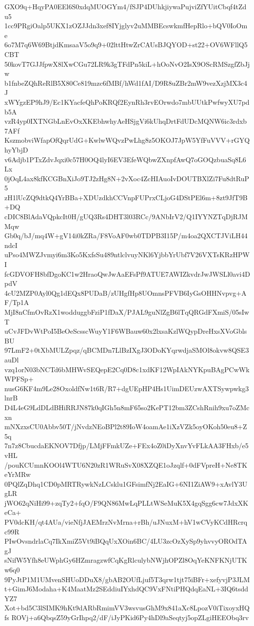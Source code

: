 GXO9q+HqyPA0EEl6S0xdqMUOGYm4/fSJP4DUhkjiywaPujviZfYUitCbqf4tZdu5
1cc9PRgiOalp5UKX1zOZJJdn3xef8IYjglyv2uMMBEcswkmfHepRlo+bQV0IoOme
6o7M7q6W69BtjdKmsaaV5o9q9+02lttHtwZrCAUsBJQYOD+st22+OV6WFllQ5CBT
50kovT7GJJfpwX8lXwCGu72LR9k3gTFdPn5kiL+hOoNvO2IsX9OScRMSzgfZbJjw
b1fnbeZQhReRlB5X80Ce819mzc6fMBf/hWd1fAI/D9R8uZBr2mW9vezXzjMX3c4J
xWYgzEP9hJ9/Ec1KYacfeQhPoKRQf2EynRh3rvEOrwdo7mbUUtkPwfwyXU7pdb5A
vzR4yp0IXTNGbLnEvOxXKEbhwhyAeHSjgVi6kUhqDrtFdUDcMQNW6ic3rdxb7AFf
KszmobviWfapOfQqrUdG+KwlwWQvzPwLhg8z5OKOJ7JpW5YfFuVVV+rGYQhyYbjD
v6Adjb1PTxZdvJqxi0c57H0OQ4lyI6EV3EfeWQbwZXnpfAwQ7oGOQzbuaSq8L6Lx
0jOqL4ax8kfKCGBnXiJo9TJ2zHg8N+2vXoc4ZcHIAuoIvDOUTBXlZi7Fu8dtRuP5
zH1lUcZQ9dtkQ4YrBBa+XDUzdkhCCVnpFUPrxCLjoG4DStPEl6m+8zt9JfT9B+DQ
cDIC8BlAdaVQpkcIt0H/gUQ3Rs4DHT3l03RCc/9ANbIrV2/Q1IYYNZTqDjRJMMqw
Gb0q/bJ/mq4W+gV14i0kZRa/F8VoAF0wb0TDPB3I15P/m4oa2QXCTJViLH44ndcI
uPso4MWZJvmyi6m3Ko5KxfsSu489ntlclvuyNKl6YjbbYrUbf7V26VXTsKRzHPWI
fcGDVOFH8bfDgoKC1w2HraoQwJwAaEFsPf9ATUE7AWIZkvdrJwJWSLl0avi4DpdV
4cU2MZP0Ayl0Qg1dEQx8PUDaB/zUHgfHp8UOmnsPFVB6IyGsOHHNvpvg+AF/Tp1A
MjI8nCfmOvRzX1wodduggbFziP1fDaX/PJAL9guNlZgB6lTqQRGdFXmiS/05sIwT
uCvJFDvWtPoI5BeOeScsscWuyY1F6WBauw60x2lxsaKzlWQypDreHxsXVoGblsBU
97LmF2+0tXbMULZpqz/qBCMDn7LlBzIXgJ3ODoKYqrwdjaSMOl8okvw8QSE3auDl
vzq1orN03bNCTd6bMHWvSEQepE2Cq0D8c1xdKF12WpIAkNYKpuBAgPCwWkWPFSp+
nusG6KF4m9Le28OxoldfNw1t6R/R7+dgUEpHP4Hs1UimDEUzwAXTSywpwkg3lnrB
D4L4eG9LdDLdBHiRRJN87k0qIGh5n8mF65so2KePT12bm3ZCshRnih9xu7oZMcxn
mNXzxsCU0Abbv50T/jNvdzNEoBPl2t89IoW4oamAe1iXzVZk5oyOKoh50eu8+Z5q
7n7z8CbucdaEKNOV7Dfjp/LMjFFmkUZe+FEx4oZ0iDyXnvYvFLkAA3FHxb/e5vHL
/pouKCUmnKOOl4WTU6N20zR1WRuSvX08XZQE1oJzqlf+0dFVpreH+Ne8TKeYrMRw
0PQlZqDhq1CD0pMRTRywkNzLCsklu1GFsimfNj2EaIG+6NI1ZiAW9+xAvlY3UgLR
jWO62qNiHi99+zqTy2+fqO/F9QN86MwLqPLLtWSeMuK5X4gqSgg6cw7JdxXKeCa+
PV0dcKH/qt4AUa/vieNfjJAEMrzNvMrna+rBh/uJNuxM+hV1wCVyKCdHRcrqc99R
PIwOvsndrlaCq7IkXmiZ5Vt9iBQqUxXOin6BC/4LU3zcOzXySp9yhvvyOROdTAgJ
sNifW5Yfh8eUWphGy6HZmragzwfCqKgRlculybNWjhOPZl8OqYeKNFKNjUTKw6q0
9PyJtP1M1UMvenSHUoDDuX8/gbAB2OUfLjuf5T3qrw1tjt75iBFr+xefyvjP3JLM
t+GimJ6Modaha+K4MaatMz2SEddiuIYxhdQC9VxFNtiPHQdqEaNL+3IQ6tsddYZ7
Xot+bd5C3lSIMK9hKt9dARbRmimVV3wsvusGhM9x841aXc8LpozV0iTixoyxHQfs
ROVj+a6QbqsZ59yGrIhpq2/dF/iJyPKid6Py4hDl9aSeqtyj5opZLgiHEEObq3rv
